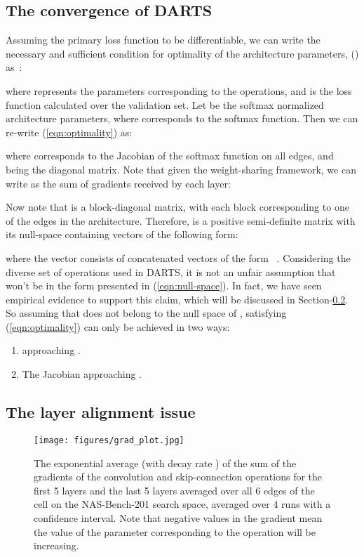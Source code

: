 \documentclass{article} \usepackage{fancyhdr, iclr2023_conference, times}
\newcommand{\lambdafn}{layer alignment\xspace}
\begin{document}
\subsection{The convergence of DARTS}
Assuming the primary loss function  to be differentiable, we can write the necessary and sufficient condition for optimality of the architecture parameters, () as~\citep{DBLP:books/cu/BV2014}:

where  represents the parameters corresponding to the operations, and  is the loss function calculated over the validation set. Let  be the softmax normalized architecture parameters, where  corresponds to the softmax function. Then we can re-write (\ref{eqn:optimality}) as:

where  corresponds to the Jacobian of the softmax function on all edges, and  being the diagonal matrix. Note that given the weight-sharing framework, we can write  as the sum of gradients received by each layer:

Now note that  is a block-diagonal matrix, with each block corresponding to one of the edges in the architecture. Therefore,  is a positive semi-definite matrix with its null-space containing vectors of the following form:
 
where the vector  consists of concatenated vectors  of the form ~\citep{DBLP:journals/corr/abs-1704-00805}. Considering the diverse set of operations used in DARTS, it is not an unfair assumption that  won't be in the form presented in (\ref{eqn:null-space}). In fact, we have seen empirical evidence to support this claim, which will be discussed in Section-\ref{sec:wsi}. So assuming that  does not belong to the null space of , satisfying (\ref{eqn:optimality}) can only be achieved in two ways:
\begin{enumerate}
    \item  approaching .
    \item The Jacobian  approaching .
\end{enumerate}
\subsection{The \lambdafn issue}
\label{sec:wsi}
\begin{figure}[t]
    \vspace{-10pt}
    \centering
    \texttt{[image: figures/grad\_plot.jpg]}
    \vspace{-5pt}
    \caption{The exponential average (with decay rate ) of the sum of the gradients of the  convolution and skip-connection operations for the first 5 layers and the last 5 layers averaged over all 6 edges of the cell on the NAS-Bench-201 search space, averaged over 4 runs with a  confidence interval. Note that negative values in the gradient mean the value of the parameter corresponding to the operation will be increasing.}
    \label{fig:grads-b}
    \vspace{-10pt}
\end{figure}
\end{document}
